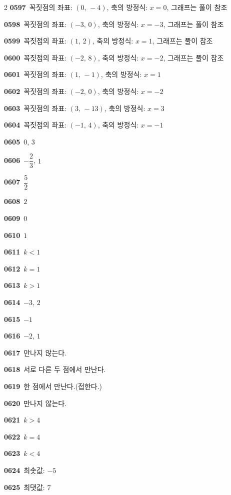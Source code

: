 \documentclass[10pt,a4paper]{article}
\begin{document}
\begin{multicols}{2}
\noindent\textbf{0597}\ 꼭짓점의 좌표: $(0,\,-4)$, 축의 방정식: $x=0$, 그래프는 풀이 참조\par
\noindent\textbf{0598}\ 꼭짓점의 좌표: $(-3,\,0)$, 축의 방정식: $x=-3$, 그래프는 풀이 참조\par
\noindent\textbf{0599}\ 꼭짓점의 좌표: $(1,\,2)$, 축의 방정식: $x=1$, 그래프는 풀이 참조\par
\noindent\textbf{0600}\ 꼭짓점의 좌표: $(-2,\,8)$, 축의 방정식: $x=-2$, 그래프는 풀이 참조\par
\noindent\textbf{0601}\ 꼭짓점의 좌표: $(1,\,-1)$, 축의 방정식: $x=1$\par
\noindent\textbf{0602}\ 꼭짓점의 좌표: $(-2,\,0)$, 축의 방정식: $x=-2$\par
\noindent\textbf{0603}\ 꼭짓점의 좌표: $(3,\,-13)$, 축의 방정식: $x=3$\par
\noindent\textbf{0604}\ 꼭짓점의 좌표: $(-1,\,4)$, 축의 방정식: $x=-1$\par
\noindent\textbf{0605}\ $0$, $3$\par
\noindent\textbf{0606}\ $-\dfrac{2}{3}$, $1$\par
\noindent\textbf{0607}\ $\dfrac{5}{2}$\par
\noindent\textbf{0608}\ $2$\par
\noindent\textbf{0609}\ $0$\par
\noindent\textbf{0610}\ $1$\par
\noindent\textbf{0611}\ $k<1$\par
\noindent\textbf{0612}\ $k=1$\par
\noindent\textbf{0613}\ $k>1$\par
\noindent\textbf{0614}\ $-3$, $2$\par
\noindent\textbf{0615}\ $-1$\par
\noindent\textbf{0616}\ $-2$, $1$\par
\noindent\textbf{0617}\ 만나지 않는다.\par
\noindent\textbf{0618}\ 서로 다른 두 점에서 만난다.\par
\noindent\textbf{0619}\ 한 점에서 만난다.(접한다.)\par
\noindent\textbf{0620}\ 만나지 않는다.\par
\noindent\textbf{0621}\ $k>4$\par
\noindent\textbf{0622}\ $k=4$\par
\noindent\textbf{0623}\ $k<4$\par
\noindent\textbf{0624}\ 최솟값: $-5$\par
\noindent\textbf{0625}\ 최댓값: $7$\par

\end{multicols}
\end{document}
